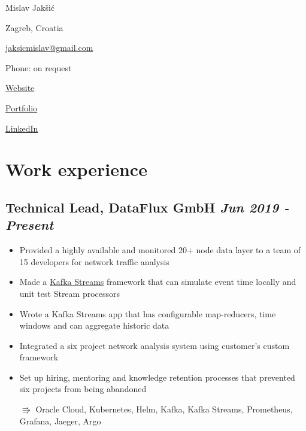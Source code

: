 \documentclass[a4paper]{article}
\newcommand{\bolditalicpair}
[2]
{\textbf{#1} \texorpdfstring{\hfill}{} \textit{#2}}
\begin{document}
\begin{multicols}{3}

\noindent
\begin{minipage}{.22\textwidth}
\raggedright

{\huge Mislav Jakšić}

Zagreb, Croatia
\end{minipage}

\noindent
\begin{minipage}{.50\textwidth}
\raggedleft

\href{mailto:jaksicmislav@gmail.com}{jaksicmislav@gmail.com}

Phone: on request

\end{minipage}

\noindent
\begin{minipage}{.32\textwidth}
\raggedleft

\href{https://mislav-jaksic.from.hr/}{Website}

\href{https://github.com/MislavJaksic}{Portfolio}

\href{https://www.linkedin.com/in/mislav-jaksic}{LinkedIn}

\end{minipage}

\end{multicols}



\section{Work experience}
\subsection{\bolditalicpair{Technical Lead, DataFlux GmbH}{Jun 2019 - Present}}

\begin{itemize}
 \item Provided a highly available and monitored 20+ node data layer to a team of 15 developers for network traffic analysis
 \item Made a \href{https://kafka.apache.org/documentation/streams/}{Kafka Streams} framework that can simulate event time locally and unit test Stream processors
 \item Wrote a Kafka Streams app that has configurable map-reducers, time windows and can aggregate historic data
 \item Integrated a six project network analysis system using customer's custom framework
 \item Set up hiring, mentoring and knowledge retention processes that prevented six projects from being abandoned
 \item[$\Rrightarrow$] Oracle Cloud, Kubernetes, Helm, Kafka, Kafka Streams, Prometheus, Grafana, Jaeger, Argo
\end{itemize}
\end{document}
